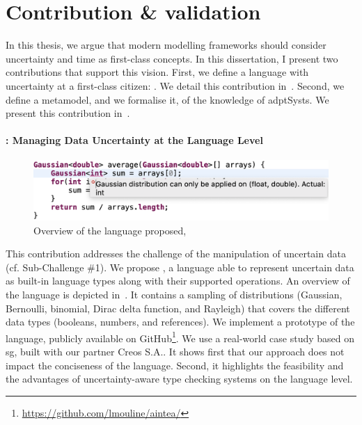 \section{Contribution \& validation}
\label{sec:intro:contrib}

In this thesis, we argue that modern modelling frameworks should consider uncertainty and time as first-class concepts.
In this dissertation, I present two contributions that support this vision.
First, we define a language with uncertainty at a first-class citizen: \langName.
We detail this contribution in~.
Second, we define a \gls{metamodel}, and we formalise it, of the knowledge of \glspl{adptSyst}.
We present this contribution in~.

\paragraph{\langName{}: Managing Data Uncertainty at the Language Level}
\begin{figure}
	\centering
	\includegraphics[width=\linewidth]{img/chapt-intro/approach/aintea-overview}
	\caption{Overview of the language proposed, \langName{}}
	\label{fig:intro:contrib:aintea}
\end{figure}

This contribution addresses the challenge of the manipulation of uncertain data (cf. Sub-Challenge \#1). 
We propose \langName{}, a language able to represent uncertain data as built-in language types along with their supported operations.
An overview of the language is depicted in~.
 It contains a sampling of distributions (Gaussian, Bernoulli, binomial, Dirac delta function, and Rayleigh) that covers the different data types (booleans, numbers, and references).
 We implement a prototype of the language, publicly available on GitHub\footnote{\url{https://github.com/lmouline/aintea/}}.
 We use a real-world case study based on \gls{sg}, built with our partner Creos S.A..
It shows first that our approach does not impact the conciseness of the language.
Second, it highlights the feasibility and the advantages of uncertainty-aware type checking systems on the language level.

